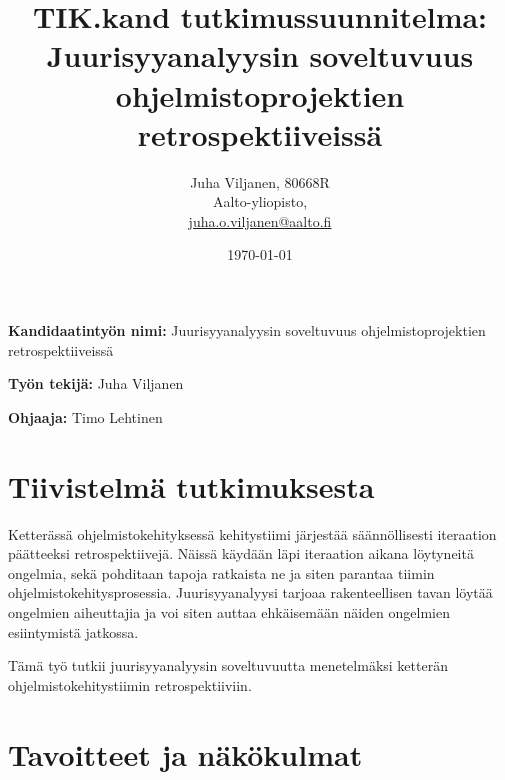 \documentclass[12pt,a4paper,finnish,oneside]{article}
\begin{document}

\title{TIK.kand tutkimussuunnitelma:\\[5mm]
Juurisyyanalyysin soveltuvuus ohjelmistoprojektien retrospektiiveissä}

\author{Juha Viljanen, 80668R\\
Aalto-yliopisto,\\
\url{juha.o.viljanen@aalto.fi}}

\date{\today}

\maketitle


\vspace{10mm}

%

\textbf{Kandidaatintyön nimi:} Juurisyyanalyysin soveltuvuus ohjelmistoprojektien retrospektiiveissä

\textbf{Työn tekijä:} Juha Viljanen

\textbf{Ohjaaja:} Timo Lehtinen


\section{Tiivistelmä tutkimuksesta}

Ketterässä ohjelmistokehityksessä kehitystiimi järjestää säännöllisesti iteraation päätteeksi retrospektiivejä. Näissä käydään läpi iteraation aikana löytyneitä ongelmia, sekä pohditaan tapoja ratkaista ne ja siten parantaa tiimin ohjelmistokehitysprosessia. Juurisyyanalyysi tarjoaa rakenteellisen tavan löytää ongelmien aiheuttajia ja voi siten auttaa ehkäisemään näiden ongelmien esiintymistä jatkossa. 

Tämä työ tutkii juurisyyanalyysin soveltuvuutta menetelmäksi ketterän ohjelmistokehitystiimin retrospektiiviin.

\section{Tavoitteet ja näkökulmat}
\end{document}
